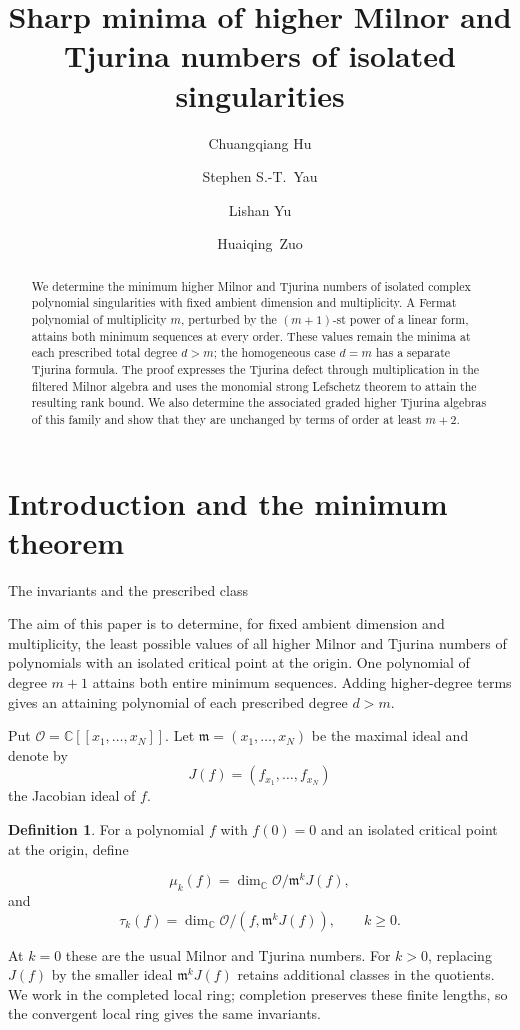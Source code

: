\documentclass[12pt,reqno]{amsart}
\title[Sharp minima of higher Milnor and Tjurina numbers]
{Sharp minima of higher Milnor and Tjurina numbers of isolated singularities}
\author{Chuangqiang Hu}
\author{Stephen S.-T.~Yau}
\author{Lishan Yu}
\author{Huaiqing~Zuo}
\makeatletter
\renewcommand\subsection{\@startsection{subsection}{2}%
  \z@{.8\linespacing\@plus.3\linespacing}{.35\linespacing}%
  {\normalfont\bfseries}}
\newcommand{\C}{\mathbb C}
\newcommand{\mm}{\mathfrak m}
\newcommand{\OO}{\mathcal O}
\theoremstyle{definition}
\newtheorem{definition}[theorem]{Definition}
\makeatother
\begin{document}
\begin{abstract}
We determine the minimum higher Milnor and Tjurina numbers of isolated
complex polynomial singularities with fixed ambient dimension and multiplicity.
A Fermat polynomial of multiplicity $m$, perturbed by the $(m+1)$-st power
of a linear form, attains both minimum sequences at every order.
These values remain the minima at each prescribed total degree $d>m$;
the homogeneous case $d=m$ has a separate Tjurina formula.
The proof expresses the Tjurina defect through multiplication in the
filtered Milnor algebra and uses the monomial strong Lefschetz theorem
to attain the resulting rank bound. We also determine the associated
graded higher Tjurina algebras of this family and show that they are
unchanged by terms of order at least $m+2$.
\end{abstract}
\maketitle
\tableofcontents

\section{Introduction and the minimum theorem}

\subsection{The invariants and the prescribed class}

The aim of this paper is to determine, for fixed ambient dimension and
multiplicity, the least possible values of all higher Milnor and
Tjurina numbers of polynomials with an isolated critical point at
the origin. One polynomial of degree $m+1$ attains both entire minimum sequences.
Adding higher-degree terms gives an attaining polynomial of each prescribed
degree $d>m$.


Put $\OO=\C[\![x_1,\ldots,x_N]\!]$. Let $\mm=(x_1,\ldots,x_N)$ be the maximal ideal and denote by 
\[ 
 J(f)=(f_{x_1},\ldots,f_{x_N})
\]
the Jacobian ideal of $f$. 
 \begin{definition}\label{def:inv}
For a polynomial $f$ with $f(0)=0$ and an isolated critical point
at the origin, define

\[
\mu_k(f)=\dim_\C \OO / \mm^k J(f),
\]
and
\[
\tau_k(f) = \dim_\C \OO/ (f,\mm^k J(f)), \qquad  k\geq 0.
\]
\end{definition}
  
At $k=0$ these are the usual Milnor and Tjurina numbers. For $k>0$,
replacing $J(f)$ by the smaller ideal $\mm^kJ(f)$ retains additional
classes in the quotients. We work in the completed local ring; completion
preserves these finite lengths, so the convergent local ring gives the
same invariants.
\end{document}
